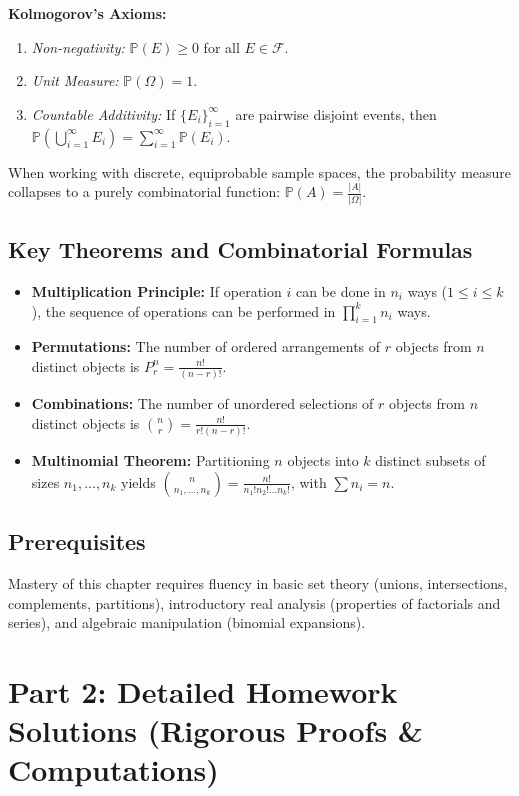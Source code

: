 \documentclass[11pt]{article}
\theoremstyle{definition}
\begin{document}
\textbf{Kolmogorov's Axioms:}
\begin{enumerate}
    \item \textit{Non-negativity:} $\mathbb{P}(E) \geq 0$ for all $E \in \mathcal{F}$.
    \item \textit{Unit Measure:} $\mathbb{P}(\Omega) = 1$.
    \item \textit{Countable Additivity:} If $\{E_i\}_{i=1}^\infty$ are pairwise disjoint events, then $\mathbb{P}\left(\bigcup_{i=1}^\infty E_i\right) = \sum_{i=1}^\infty \mathbb{P}(E_i)$.
\end{enumerate}
When working with discrete, equiprobable sample spaces, the probability measure collapses to a purely combinatorial function: $\mathbb{P}(A) = \frac{|A|}{|\Omega|}$. 

\subsection{Key Theorems and Combinatorial Formulas}
\begin{itemize}
    \item \textbf{Multiplication Principle:} If operation $i$ can be done in $n_i$ ways ($1 \leq i \leq k$), the sequence of operations can be performed in $\prod_{i=1}^k n_i$ ways.
    \item \textbf{Permutations:} The number of ordered arrangements of $r$ objects from $n$ distinct objects is $P^n_r = \frac{n!}{(n-r)!}$.
    \item \textbf{Combinations:} The number of unordered selections of $r$ objects from $n$ distinct objects is $\binom{n}{r} = \frac{n!}{r!(n-r)!}$.
    \item \textbf{Multinomial Theorem:} Partitioning $n$ objects into $k$ distinct subsets of sizes $n_1, \dots, n_k$ yields $\binom{n}{n_1, \dots, n_k} = \frac{n!}{n_1! n_2! \dots n_k!}$, with $\sum n_i = n$.
\end{itemize}

\subsection{Prerequisites}
Mastery of this chapter requires fluency in basic set theory (unions, intersections, complements, partitions), introductory real analysis (properties of factorials and series), and algebraic manipulation (binomial expansions).

\section{Part 2: Detailed Homework Solutions (Rigorous Proofs \& Computations)}
\end{document}
